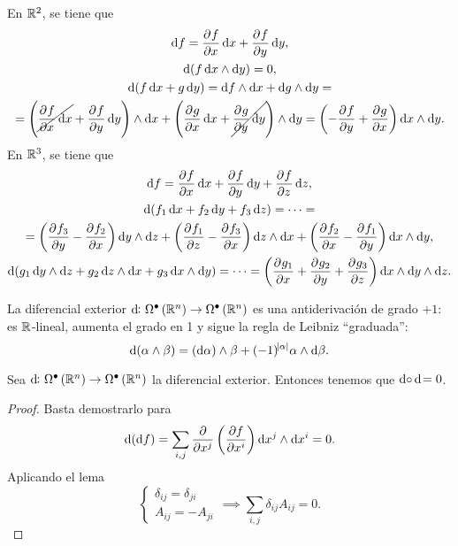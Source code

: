 \begin{example*}
    En $\mathbb{R}^2$, se tiene que
    \begin{gather*}
        \dif f = \pdv{f}{x} \dif x + \pdv{f}{y} \dif y, \\
        \dif \left( f \dif x \wedge \dif y \right) = 0, \\
        \dif\left( f \dif x + g \dif y \right) = \dif f \wedge \dif x + \dif g \wedge \dif y =\\=
        \left( \cancel{\pdv{f}{x} \dif x} + \pdv{f}{y} \dif y \right) \wedge \dif x + \left( \pdv{g}{x} \dif x + \cancel{\pdv{g}{y} \dif y} \right)\wedge \dif y =
        \left( -\pdv{f}{y} + \pdv{g}{x} \right) \dif x \wedge \dif y.
    \end{gather*}
    En $\mathbb{R}^3$, se tiene que
    \begin{gather*}
        \dif f = \pdv{f}{x} \dif x + \pdv{f}{y} \dif y + \pdv{f}{z} \dif z, \\
        \dif \left( f_1 \dif x + f_2 \dif y + f_3 \dif z \right) = \cdots = \\ = \left( \pdv{f_3}{y} - \pdv{f_2}{x} \right)\dif y \wedge \dif z +
        \left( \pdv{f_1}{z} - \pdv{f_3}{x} \right) \dif z \wedge \dif x + \left( \pdv{f_2}{x} - \pdv{f_1}{y} \right)\dif x \wedge \dif y, \\
        \dif \left( g_1 \dif y \wedge \dif z +  g_2 \dif z \wedge \dif x + g_3 \dif x \wedge \dif y \right) = \cdots =
        \left( \pdv{g_1}{x} + \pdv{g_2}{y} + \pdv{g_3}{z} \right) \dif x \wedge \dif y \wedge \dif z.
    \end{gather*}
\end{example*}

\begin{obs}
    La diferencial exterior $\dif \colon \Omega^\bullet \left( \real^n \right) \to \Omega^\bullet \left( \real^n \right)$ es una antiderivación de
    grado $+1$: es $\mathbb{R}$-lineal, aumenta el grado en 1 y sigue la regla de Leibniz ``graduada'':
    \[
        \dif \left( \alpha \wedge \beta \right) = \left( \dif \alpha \right) \wedge \beta + (-1)^{\abs{\alpha}} \alpha \wedge \dif \beta.
    \]
\end{obs}

\begin{prop}\label{prop:d-cuadrado}
    Sea $\dif \colon \Omega^\bullet \left( \real^n \right) \to \Omega^\bullet \left( \real^n \right)$ la diferencial exterior. Entonces tenemos que $\dif \circ \dif = 0$.
\end{prop}
\begin{proof}
    Basta demostrarlo para
    \[
        \dif \left( \dif f \right) = \sum_{i,j} \frac{\partial}{\partial x^j} \left( \frac{\partial f}{\partial x^i} \right) \dif x^j \wedge \dif x^i = 0.
    \]
    Aplicando el lema
    \[
        \begin{cases}
            \delta_{ij} = \delta_{ji} \\ A_{ij} = - A_{ji}
        \end{cases} \implies
        \sum_{i,j} \delta_{ij} A_{ij} = 0.
    \]
\end{proof}

